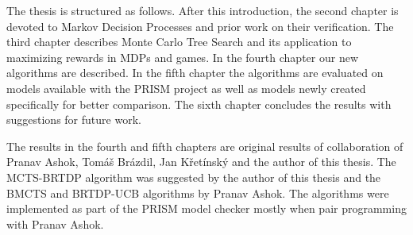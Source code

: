 The thesis is structured as follows. After this introduction, the second
chapter is devoted to Markov Decision Processes and prior work on their
verification.
The third chapter describes Monte Carlo Tree Search and its application
to maximizing rewards in MDPs and games. In the fourth chapter our new
algorithms are described. In the fifth chapter
the algorithms are evaluated on models available with the PRISM project
as well as models newly created specifically for better comparison.
The sixth chapter concludes the
results with suggestions for future work.

The results in the fourth and fifth chapters are original results of
collaboration of Pranav Ashok, Tomáš Brázdil, Jan Křetínský and the
author of this thesis. The MCTS-BRTDP algorithm was suggested by the
author of this thesis and the BMCTS and BRTDP-UCB algorithms by Pranav
Ashok. The algorithms were implemented as part of the PRISM model
checker mostly when pair programming with Pranav Ashok.
